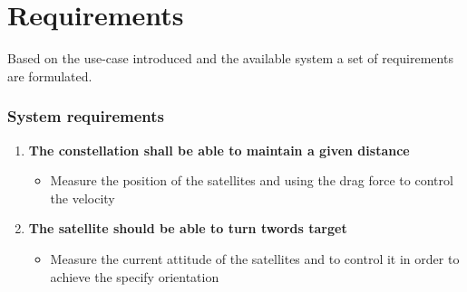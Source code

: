\chapter{Requirements}\label{chap:requirements}
Based on the use-case introduced and the available system a set of requirements are formulated.
%
\subsection*{System requirements}
%
\begin{enumerate}
	\item \textbf{The constellation shall be able to maintain a given distance} 
	\begin{itemize}
		\item []Measure the position of the satellites and using the drag force to control the velocity 
	\end{itemize}
	\item \textbf{The satellite should be able to turn twords target}
	\begin{itemize}
		\item[] Measure the current attitude of the satellites and to control it in order to achieve the specify orientation
	\end{itemize}
	
\end{enumerate}

